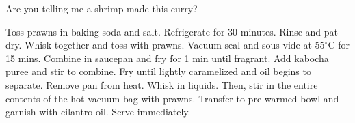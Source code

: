 \documentclass[main]{subfiles}
\begin{document}
Are you telling me a shrimp made this curry?

\begin{rec}
Toss prawns in baking soda and salt. Refrigerate for 30 minutes.
Rinse and pat dry.
Whisk together and toss with prawns.
Vacuum seal and sous vide at 55$^\circ$C for 15 mins.
Combine in saucepan and fry for 1 min until fragrant.
Add kabocha puree and stir to combine. Fry until lightly caramelized and oil begins to separate.
\newstep
{}
Remove pan from heat. Whisk in liquids.
Then, stir in the entire contents of the hot vacuum bag with prawns.
\newstep
{}
Transfer to pre-warmed bowl and garnish with cilantro oil. Serve immediately.
\end{rec}
\end{document}
